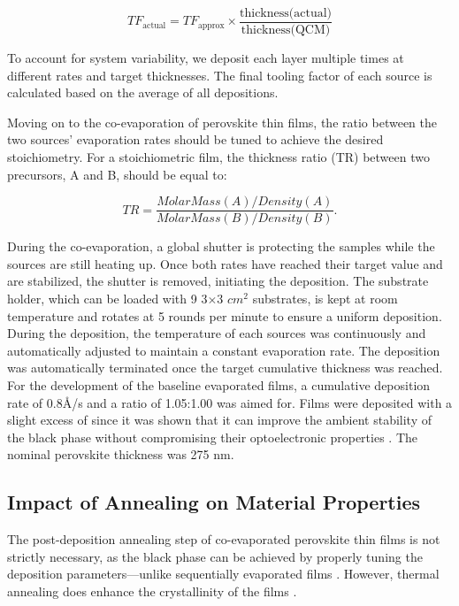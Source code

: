 \begin{equation}
    TF_{\text{actual}} = TF_{\text{approx}} \times \frac{\text{thickness(actual)}}{\text{thickness(QCM)}}
\end{equation}

To account for system variability, we deposit each layer multiple times at different rates and target thicknesses. The final tooling factor of each source is calculated based on the average of all depositions.


Moving on to the co-evaporation of perovskite thin films, the ratio between the two sources' evaporation rates should be tuned to achieve the desired stoichiometry. For a stoichiometric film, the thickness ratio (TR) between two precursors, A and B, should be equal to: 

\begin{equation}
    TR = \frac{MolarMass(A)/Density(A)}{MolarMass(B)/Density(B)}.
\end{equation}

During the co-evaporation, a global shutter is protecting the samples while the sources are still heating up. Once both rates have reached their target value and are stabilized, the shutter is removed, initiating the deposition. The substrate holder, which can be loaded with 9 3$\times$3 $cm^2$ substrates, is kept at room temperature and rotates at 5 rounds per minute to ensure a uniform deposition. During the deposition, the temperature of each sources was continuously and automatically adjusted to maintain a constant evaporation rate. The deposition was automatically terminated once the target cumulative thickness was reached. For the development of the baseline evaporated films, a cumulative deposition rate of 0.8{\AA}/s and a  ratio of 1.05:1.00 was aimed for. Films were deposited with a slight excess of  since it was shown that it can improve the ambient stability of the black phase without compromising their optoelectronic properties \cite{Ma2017TheCells}. The nominal perovskite thickness was 275 nm. 

\subsection{Impact of Annealing on Material Properties}

The post-deposition annealing step of co-evaporated perovskite thin films is not strictly necessary, as the black phase can be achieved by properly tuning the deposition parameters---unlike sequentially evaporated films \cite{DongGrowthFilm}. However, thermal annealing does enhance the crystallinity of the films \cite{Frolova2017HighlyPbIsub2/sub}. 

